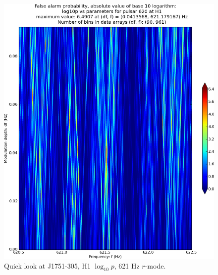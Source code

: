 \begin{figure}
\begin{center}
\includegraphics[width=0.68\paperwidth,height=0.48\paperheight]{plots/DFvsFresultsProb-H1_pulsar-620.eps}
\caption{
Quick look at J1751-305, H1 $\log_{10}p$, 621 Hz $r$-mode.}
\end{center}
\end{figure}


